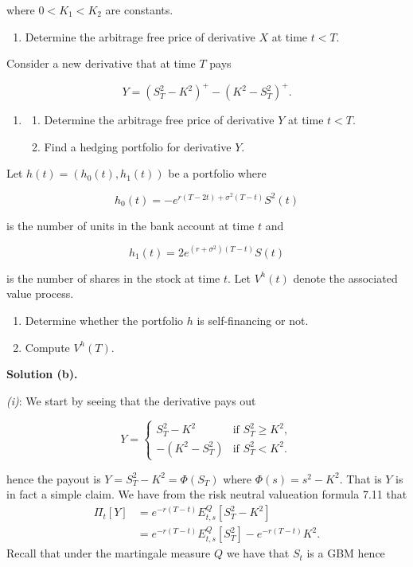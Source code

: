 \documentclass[a4paper,12pt,openany]{book}
\providecommand{\tightlist}{%
 \setlength{\itemsep}{0pt}\setlength{\parskip}{0pt}}
\begin{document}
where \(0<K_1<K_2\) are constants.

\begin{enumerate}
\def\labelenumi{\alph{enumi}.}
\tightlist
\item
  Determine the arbitrage free price of derivative \(X\) at time \(t<T\).
\end{enumerate}

Consider a new derivative that at time \(T\) pays

\[
Y=(S^2_T-K^2)^+-(K^2-S^2_T)^+.
\]

\begin{enumerate}
\def\labelenumi{\alph{enumi}.}
\setcounter{enumi}{1}
\item
  \begin{enumerate}
  \def\labelenumii{\roman{enumii}.}
  \tightlist
  \item
    Determine the arbitrage free price of derivative \(Y\) at time \(t<T\).
  \item
    Find a hedging portfolio for derivative \(Y\).
  \end{enumerate}
\end{enumerate}

Let \(h(t)=(h_0(t),h_1(t))\) be a portfolio where

\[
h_0(t)=-e^{r(T-2t)+\sigma^2(T-t)}S^2(t)
\]

is the number of units in the bank account at time \(t\) and

\[
h_1(t)=2e^{(r+\sigma^2)(T-t)}S(t)
\]

is the number of shares in the stock at time \(t\). Let \(V^h(t)\) denote the associated value process.

\begin{enumerate}
\def\labelenumi{\alph{enumi}.}
\setcounter{enumi}{2}
\tightlist
\item
  Determine whether the portfolio \(h\) is self-financing or not.
\item
  Compute \(V^h(T)\).
\end{enumerate}

\textbf{Solution (b).}

\emph{(i)}: We start by seeing that the derivative pays out

\[
Y=
\begin{cases}
  S_T^2-K^2 & \text{if }S_T^2\ge K^2,\\
  -(K^2-S_T^2) &\text{if }S_T^2< K^2.
\end{cases}
\]

hence the payout is \(Y=S_T^2-K^2=\Phi(S_T)\) where \(\Phi(s)=s^2-K^2\). That is \(Y\) is in fact a simple claim. We have from the risk neutral valueation formula 7.11 that
\begin{align*}
\Pi_t[Y]&=e^{-r(T-t)}E^Q_{t,s}[S_T^2-K^2]\\
&=e^{-r(T-t)}E^Q_{t,s}[S_T^2]-e^{-r(T-t)}K^2.
\end{align*}
Recall that under the martingale measure \(Q\) we have that \(S_t\) is a GBM hence
\end{document}
